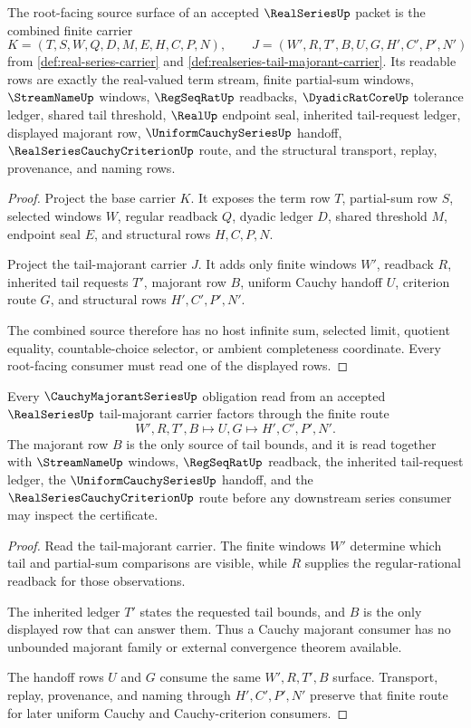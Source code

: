 \begin{theorem}
\label{thm:realseries-root-source-carrier}
The root-facing source surface of an accepted $\RealSeriesUp$ packet is the combined finite carrier
$$
K=(T,S,W,Q,D,M,E,H,C,P,N),\qquad J=(W',R,T',B,U,G,H',C',P',N')
$$
from \autoref{def:real-series-carrier} and \autoref{def:realseries-tail-majorant-carrier}. Its readable rows are exactly the real-valued term stream, finite partial-sum windows, $\StreamNameUp$ windows, $\RegSeqRatUp$ readbacks, $\DyadicRatCoreUp$ tolerance ledger, shared tail threshold, $\RealUp$ endpoint seal, inherited tail-request ledger, displayed majorant row, $\UniformCauchySeriesUp$ handoff, $\RealSeriesCauchyCriterionUp$ route, and the structural transport, replay, provenance, and naming rows.
\end{theorem}
\begin{proof}
Project the base carrier $K$. It exposes the term row $T$, partial-sum row $S$, selected windows $W$, regular readback $Q$, dyadic ledger $D$, shared threshold $M$, endpoint seal $E$, and structural rows $H,C,P,N$.

Project the tail-majorant carrier $J$. It adds only finite windows $W'$, readback $R$, inherited tail requests $T'$, majorant row $B$, uniform Cauchy handoff $U$, criterion route $G$, and structural rows $H',C',P',N'$.

The combined source therefore has no host infinite sum, selected limit, quotient equality, countable-choice selector, or ambient completeness coordinate. Every root-facing consumer must read one of the displayed rows.
\end{proof}

\begin{theorem}
\label{thm:realseries-cauchy-majorant-handoff}
Every $\CauchyMajorantSeriesUp$ obligation read from an accepted $\RealSeriesUp$ tail-majorant carrier factors through the finite route
$$
W',R,T',B\longmapsto U,G\longmapsto H',C',P',N' .
$$
The majorant row $B$ is the only source of tail bounds, and it is read together with $\StreamNameUp$ windows, $\RegSeqRatUp$ readback, the inherited tail-request ledger, the $\UniformCauchySeriesUp$ handoff, and the $\RealSeriesCauchyCriterionUp$ route before any downstream series consumer may inspect the certificate.
\end{theorem}
\begin{proof}
Read the tail-majorant carrier. The finite windows $W'$ determine which tail and partial-sum comparisons are visible, while $R$ supplies the regular-rational readback for those observations.

The inherited ledger $T'$ states the requested tail bounds, and $B$ is the only displayed row that can answer them. Thus a Cauchy majorant consumer has no unbounded majorant family or external convergence theorem available.

The handoff rows $U$ and $G$ consume the same $W',R,T',B$ surface. Transport, replay, provenance, and naming through $H',C',P',N'$ preserve that finite route for later uniform Cauchy and Cauchy-criterion consumers.
\end{proof}

